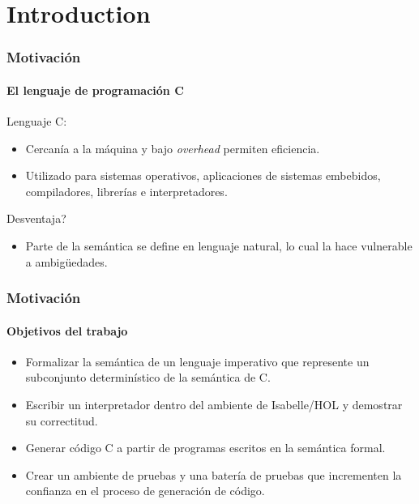 \section{Introduction}

\begin{frame}
\frametitle{Motivación}
\framesubtitle{El lenguaje de programación C}

\pause

Lenguaje C:

\pause

\begin{itemize}
\item{Cercanía  a la máquina y bajo \textit{overhead} permiten eficiencia.}
\pause
\item{Utilizado para sistemas operativos, aplicaciones de sistemas embebidos, compiladores, librerías e interpretadores.}
\pause
\end{itemize}

Desventaja?
\pause
\begin{itemize}
\item{Parte de la semántica se define en lenguaje natural, lo cual la hace vulnerable a ambigüedades.}
\end{itemize}

\end{frame}


\begin{frame}
\frametitle{Motivación}
\framesubtitle{Objetivos del trabajo}

\pause
\begin{itemize}
\item{Formalizar la semántica de un lenguaje imperativo que represente un subconjunto determinístico de la semántica de C.}
\pause
\item{Escribir un interpretador dentro del ambiente de Isabelle/HOL y demostrar su correctitud.}
\pause
\item{Generar código C a partir de programas escritos en la semántica formal.}
\pause
\item{Crear un ambiente de pruebas y una batería de pruebas que incrementen la confianza en el proceso de generación de código.}
\end{itemize}

\end{frame}


